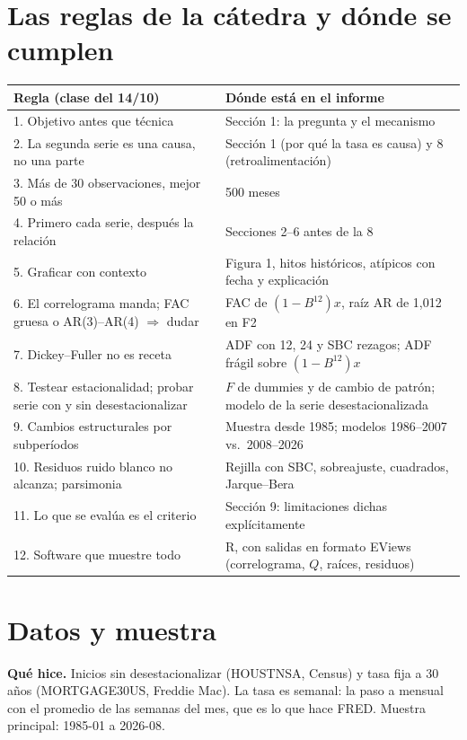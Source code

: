\documentclass[11pt,a4paper]{article}
\begin{document}
\section{Las reglas de la c\'atedra y d\'onde se cumplen}
\begin{center}\small
\begin{tabularx}{\linewidth}{>{\raggedright}p{6.2cm}X}
\toprule
Regla (clase del 14/10) & D\'onde est\'a en el informe \\
\midrule
1. Objetivo antes que t\'ecnica & Secci\'on 1: la pregunta y el mecanismo \\
2. La segunda serie es una causa, no una parte & Secci\'on 1 (por qu\'e la tasa es causa) y 8 (retroalimentaci\'on) \\
3. M\'as de 30 observaciones, mejor 50 o m\'as & 500 meses \\
4. Primero cada serie, despu\'es la relaci\'on & Secciones 2--6 antes de la 8 \\
5. Graficar con contexto & Figura 1, hitos hist\'oricos, at\'ipicos con fecha y explicaci\'on \\
6. El correlograma manda; FAC gruesa o AR(3)--AR(4) $\Rightarrow$ dudar & FAC de $(1-B^{12})x$, ra\'iz AR de 1,012 en F2 \\
7. Dickey--Fuller no es receta & ADF con 12, 24 y SBC rezagos; ADF fr\'agil sobre $(1-B^{12})x$ \\
8. Testear estacionalidad; probar serie con y sin desestacionalizar & $F$ de dummies y de cambio de patr\'on; modelo de la serie desestacionalizada \\
9. Cambios estructurales por subper\'iodos & Muestra desde 1985; modelos 1986--2007 vs.\ 2008--2026 \\
10. Residuos ruido blanco no alcanza; parsimonia & Rejilla con SBC, sobreajuste, cuadrados, Jarque--Bera \\
11. Lo que se eval\'ua es el criterio & Secci\'on 9: limitaciones dichas expl\'icitamente \\
12. Software que muestre todo & R, con salidas en formato EViews (correlograma, $Q$, ra\'ices, residuos) \\
\bottomrule
\end{tabularx}
\end{center}

\section{Datos y muestra}
\textbf{Qu\'e hice.} Inicios sin desestacionalizar (HOUSTNSA, Census) y tasa fija a 30 a\~nos (MORTGAGE30US, Freddie Mac). La tasa es semanal: la paso a mensual con el promedio de las semanas del mes, que es lo que hace FRED. Muestra principal: 1985-01 a 2026-08.
\end{document}
